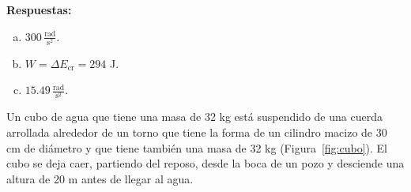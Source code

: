 \documentclass[addpoints]{exam}
\newcommand{\rtas}{\textbf{Respuestas: }}
\begin{document}
\begin{questions}

    \rtas
    \begin{enumerate}[(a)]
        \item $300 \, \frac{\text{rad}}{\text{s}^2}$.
        \item $W = \Delta E_\text{cr} = 294$ J.
        \item $15.49 \, \frac{\text{rad}}{\text{s}^2}$.
    \end{enumerate}

    \question Un cubo de agua que tiene una masa de 32 kg está suspendido de una cuerda arrollada alrededor de un torno que tiene la forma de un cilindro macizo de 30 cm de diámetro y que tiene también una masa de 32 kg (Figura~\ref{fig:cubo}). El cubo se deja caer, partiendo del reposo, desde la boca de un pozo y desciende una altura de 20 m antes de llegar al agua.
\end{questions}
\end{document}
